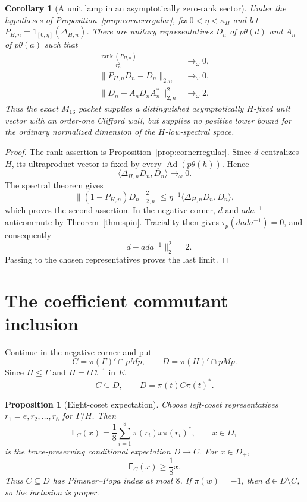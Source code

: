 \documentclass[11pt]{article}
\newtheorem{proposition}[theorem]{Proposition}
\newtheorem{corollary}[theorem]{Corollary}
\theoremstyle{definition}
\theoremstyle{remark}
\newcommand{\Ad}{\operatorname{Ad}}
\newcommand{\rank}{\operatorname{rank}}
\begin{document}
\begin{corollary}[A unit lamp in an asymptotically zero-rank sector]
\label{cor:lampzerorank}
Under the hypotheses of Proposition~\ref{prop:cornerregular}, fix
$0<\eta<\kappa_H$ and let
$P_{H,n}=1_{[0,\eta]}(\Delta_{H,n})$.  There are unitary representatives
$D_n$ of $p\theta(d)$ and $A_n$ of $p\theta(a)$ such that
\begin{align*}
 \frac{\rank(P_{H,n})}{r_n^2}&\longrightarrow_\omega0,\\
 \|P_{H,n}D_n-D_n\|_{2,n}&\longrightarrow_\omega0,\\
 \|D_n-A_nD_nA_n^*\|_{2,n}^2&\longrightarrow_\omega2.
\end{align*}
Thus the exact $M_{16}$ packet supplies a distinguished asymptotically
$H$-fixed unit vector with an order-one Clifford wall, but supplies no
positive lower bound for the ordinary normalized dimension of the
$H$-low-spectral space.
\end{corollary}

\begin{proof}
The rank assertion is Proposition~\ref{prop:cornerregular}.  Since $d$
centralizes $H$, its ultraproduct vector is fixed by every
$\Ad(p\theta(h))$.  Hence
\[
 \langle\Delta_{H,n}D_n,D_n\rangle\longrightarrow_\omega0.
\]
The spectral theorem gives
\[
 \|(1-P_{H,n})D_n\|_{2,n}^2
 \le\eta^{-1}\langle\Delta_{H,n}D_n,D_n\rangle,
\]
which proves the second assertion.  In the negative corner, $d$ and
$ada^{-1}$ anticommute by Theorem~\ref{thm:spin}.  Traciality then gives
$\tau_p(dada^{-1})=0$, and consequently
\[
 \|d-ada^{-1}\|_2^2=2.
\]
Passing to the chosen representatives proves the last limit.
\end{proof}

\section{The coefficient commutant inclusion}

Continue in the negative corner and put
\[
 C=\pi(\Gamma)'\cap pMp,
 \qquad D=\pi(H)'\cap pMp.
\]
Since $H\le\Gamma$ and $H=t\Gamma t^{-1}$ in $E$,
\begin{equation}\label{eq:CD}
 C\subseteq D,
 \qquad D=\pi(t)C\pi(t)^*.
\end{equation}

\begin{proposition}[Eight-coset expectation]\label{prop:expect}
Choose left-coset representatives $r_1=e,r_2,\ldots,r_8$ for $\Gamma/H$.
Then
\[
 \mathsf E_C(x)=\frac18\sum_{i=1}^8
 \pi(r_i)x\pi(r_i)^*,\qquad x\in D,
\]
is the trace-preserving conditional expectation $D\to C$.  For $x\in D_+$,
\[
 \mathsf E_C(x)\ge\frac18x.
\]
Thus $C\subseteq D$ has Pimsner--Popa index at most $8$.
If $\pi(w)=-1$, then $d\in D\setminus C$, so the inclusion is proper.
\end{proposition}
\end{document}
